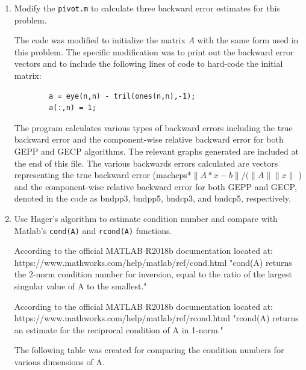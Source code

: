 \documentclass[12pt,letterpaper,reqno]{amsart}
\begin{document}
\begin{enumerate}
\begin{enumerate}
\begin{flushleft}
    \newline
    \end{flushleft}
    \newpage
    \item Modify the \texttt{pivot.m} to calculate three backward error estimates for this problem.
    \begin{flushleft}
    The code was modified to initialize the matrix $A$ with the same form used in this problem. The specific modification was to print out the backward error vectors and to include the following lines of code to hard-code the initial matrix:
    \begin{lstlisting}
        a = eye(n,n) - tril(ones(n,n),-1);
        a(:,n) = 1;
    \end{lstlisting}
    The program calculates various types of backward errors including the true backward error and the component-wise relative backward error for both GEPP and GECP algorithms. The relevant graphs generated are included at the end of this file. The various backwards errors calculated are vectors representing the true backward error (macheps*$\|A*x-b\| / (\|A\| \|x\|$ ) and the component-wise relative backward error for both GEPP and GECP, denoted in the code as bndpp3, bndpp5, bndcp3, and bndcp5, respectively.
    \newline
    \end{flushleft}
    \item Use Hager's algorithm to estimate condition number and compare with Matlab's \texttt{cond(A)} and \texttt{rcond(A)} functions.\newline
    
    \begin{flushleft}
    According to the official MATLAB R2018b documentation located at: https://www.mathworks.com/help/matlab/ref/cond.html \newline
    "cond(A) returns the 2-norm condition number for inversion, equal to the ratio of the largest singular value of A to the smallest."
    \newline
    
    According to the official MATLAB R2018b documentation located at: https://www.mathworks.com/help/matlab/ref/rcond.html \newline
    "rcond(A) returns an estimate for the reciprocal condition of A in 1-norm."
    \newline
    
    The following table was created for comparing the condition numbers for various dimensions of A.
    \newline
    

\end{flushleft}
\end{enumerate}
\end{enumerate}
\end{document}
